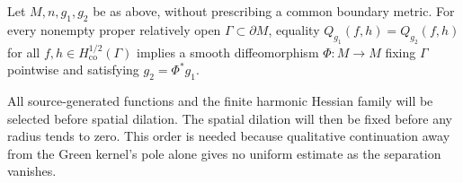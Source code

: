 \begin{theorem}\label{main:patch}
Let $M,n,g_1,g_2$ be as above, without prescribing a common boundary
metric. For every nonempty proper relatively open
$\Gamma\subset\partial M$, equality
$Q_{g_1}(f,h)=Q_{g_2}(f,h)$ for all
$f,h\in H^{1/2}_{\mathrm{co}}(\Gamma)$ implies a smooth
diffeomorphism $\Phi:M\to M$ fixing $\Gamma$ pointwise and satisfying
$g_2=\Phi^*g_1$.
\end{theorem}

All source-generated functions and the finite harmonic Hessian family
will be selected before spatial dilation. The spatial dilation will
then be fixed before any radius tends to zero. This order is needed
because qualitative continuation away from the Green kernel's pole
alone gives no uniform estimate as the separation vanishes.
